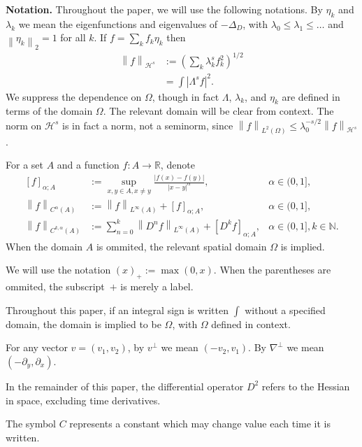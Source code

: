 \documentclass[11pt]{amsart}
\theoremstyle{remark}
\theoremstyle{definition}
\newcommand{\R}{\mathbb{R}}
\newcommand{\N}{\mathbb{N}}
\newcommand{\norm}[1]{\left\lVert#1\right\rVert}
\newcommand{\paren}[1]{\left( #1 \right)}
\newcommand{\bracket}[1]{\left[ #1 \right]}
\newcommand{\abs}[1]{\left\lvert #1 \right\rvert}
\newcommand{\del}{\partial}
\newcommand{\grad}{\nabla}
\newcommand{\Laplace}{\Delta}
\newcommand{\eigen}[1]{\eta_{#1}} %
\newcommand{\HD}{\mathcal{H}}
\newcommand{\HDint}[2]{\int \abs{\Lambda^{#1} #2}^2}
\begin{document}
\textbf{Notation.} Throughout the paper, we will use the following notations.
By $\eigen{k}$ and $\lambda_k$ we mean the eigenfunctions and eigenvalues of $-\Laplace_D$, with $\lambda_0 \leq \lambda_1 \leq \ldots$ and $\norm{\eigen{k}}_2 = 1$ for all $k$.  
If $f = \sum_k f_k \eigen{k}$ then
\begin{align*} 
\norm{f}_{\HD^s} &:= \paren{\sum_k \lambda_k^{s} f_k^2}^{1/2} 
\\ &= \HDint{s}{f}. 
\end{align*}
We suppress the dependence on $\Omega$, though in fact $\Lambda$, $\lambda_k$, and $\eigen{k}$ are defined in terms of the domain $\Omega$.  The relevant domain will be clear from context.  The norm on $\HD^s$ is in fact a norm, not a seminorm, since $\norm{f}_{L^2(\Omega)} \leq \lambda_0^{-s/2} \norm{f}_{\HD^s}$.  

For a set $A$ and a function $f:A \to \R$, denote
\begin{align*}
\bracket{f}_{\alpha;A} &:= \sup_{x,y \in A, x \neq y} \frac{|f(x)-f(y)|}{|x-y|^\alpha},  &\alpha \in (0,1], \\
\norm{f}_{C^\alpha(A)} &:= \norm{f}_{L^\infty(A)} + \bracket{f}_{\alpha;A}, & \alpha \in (0,1], \\
\norm{f}_{C^{k,\alpha}(A)} &:= \sum_{n=0}^k \norm{D^n f}_{L^\infty(A)} + \bracket{D^k f}_{\alpha;A}, & \alpha \in (0,1], k \in \N.
\end{align*}
When the domain $A$ is ommited, the relevant spatial domain $\Omega$ is implied.  

We will use the notation $(x)_+ := \max(0,x)$.  When the parentheses are ommited, the subscript~$+$ is merely a label.  

Throughout this paper, if an integral sign is written $\int$ without a specified domain, the domain is implied to be $\Omega$, with $\Omega$ defined in context.  

For any vector $v = (v_1,v_2)$, by $v^\perp$ we mean $(-v_2,v_1)$. By $\grad^\perp$ we mean $(-\del_y, \del_x)$.  

In the remainder of this paper, the differential operator $D^2$ refers to the Hessian in space, excluding time derivatives.  


The symbol $C$ represents a constant which may change value each time it is written.  
\end{document}
